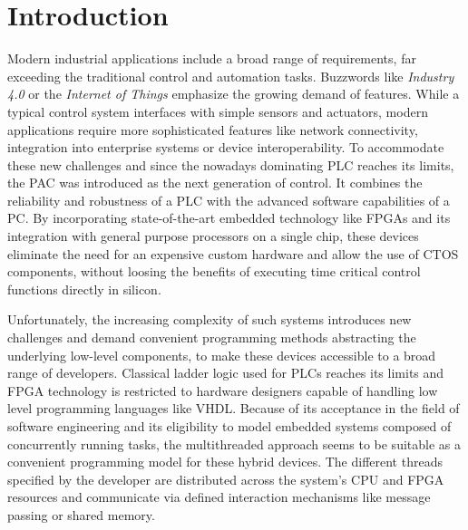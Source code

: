 \chapter{Introduction}

Modern industrial applications include a broad range of requirements, far
exceeding the traditional control and automation tasks. Buzzwords like
\emph{Industry 4.0} or the \emph{Internet of Things} emphasize the growing
demand of features. While a typical control system interfaces with simple
sensors and actuators, modern applications require more sophisticated features
like network connectivity, integration into enterprise systems or device
interoperability. To accommodate these new challenges and since the nowadays
dominating \ac{PLC} reaches its limits, the \ac{PAC} was introduced as the
next generation of control. It combines the reliability and robustness of a
\ac{PLC} with the advanced software capabilities of a \ac{PC}. By
incorporating state-of-the-art embedded technology like \acp{FPGA} and its
integration with general purpose processors on a single chip, these devices
eliminate the need for an expensive custom hardware and allow  the use of
\ac{CTOS} components, without loosing the benefits of executing time critical
control functions directly in silicon.

Unfortunately, the increasing complexity of such systems introduces new
challenges and demand convenient programming methods abstracting the
underlying low-level components, to make these devices accessible to a broad
range of developers. Classical ladder logic used for \acp{PLC} reaches its
limits and \ac{FPGA} technology is restricted to hardware designers capable of
handling low level programming languages like \ac{VHDL}. Because of its
acceptance in the field of software engineering and its eligibility to model
embedded systems composed of concurrently running tasks, the multithreaded
approach seems to be suitable as a convenient programming model for these
hybrid devices. The different threads specified by the developer are
distributed across the system's \ac{CPU} and \ac{FPGA} resources and
communicate via defined interaction mechanisms like message passing or shared
memory.

